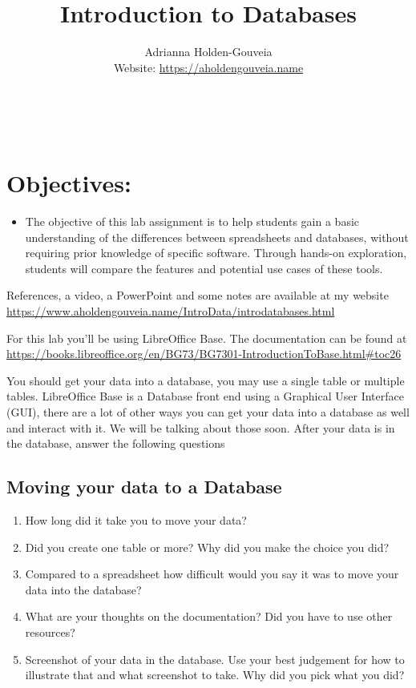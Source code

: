 \documentclass[12pt]{article}
\title{Introduction to Databases}
\author{
        Adrianna Holden-Gouveia \\
        Website: \url{https://aholdengouveia.name}\\ 
        \date{\vspace{-5ex}}
        \faLinkedin{: aholdengouveia} \\
        \faGithub {: aholdengouveia} \\
        }
\begin{document}
    

\maketitle


\section*{Objectives:}
\begin{itemize}
    \item The objective of this lab assignment is to help students gain a basic understanding of the differences between spreadsheets and databases, without requiring prior knowledge of specific software. Through hands-on exploration, students will compare the features and potential use cases of these tools.
\end{itemize}


References, a video, a PowerPoint and some notes are available at my website
\url {https://www.aholdengouveia.name/IntroData/introdatabases.html}

For this lab you'll be using LibreOffice Base.  The documentation can be found at \url{https://books.libreoffice.org/en/BG73/BG7301-IntroductionToBase.html#toc26}  

You should get your data into a database, you may use a single table or multiple tables. LibreOffice Base is a Database front end using a Graphical User Interface (GUI), there are a lot of other ways you can get your data into a database as well and interact with it. We will be talking about those soon. After your data is in the database, answer the following questions




\subsection*{Moving your data to a Database}
    \begin{enumerate}
        \item How long did it take you to move your data?
        \item Did you create one table or more? Why did you make the choice you did?
        \item Compared to a spreadsheet how difficult would you say it was to move your data into the database?
        \item What are your thoughts on the documentation? Did you have to use other resources? 
        \item Screenshot of your data in the database.  Use your best judgement for how to illustrate that and what screenshot to take.  Why did you pick what you did?
    \end{enumerate}
\end{document}

